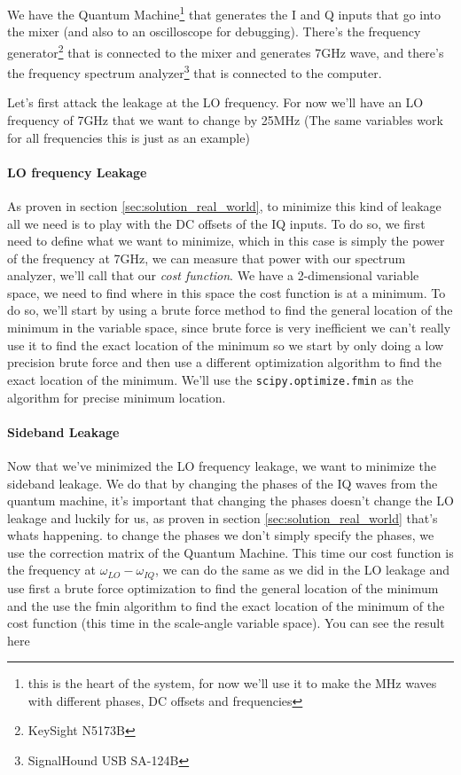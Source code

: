 We have the Quantum Machine\footnote{this is the heart of the system, for now we'll use it to make the MHz waves with different phases, DC offsets and frequencies} that generates the I and Q inputs that go into the mixer (and also to an oscilloscope for debugging). There's the frequency generator\footnote{KeySight N5173B} that is connected to the mixer and generates 7GHz wave, and there's the frequency spectrum analyzer\footnote{SignalHound USB SA-124B} that is connected to the computer.

Let's first attack the leakage at the LO frequency. For now we'll have an LO frequency of 7GHz that we want to change by 25MHz (The same variables work for all frequencies this is just as an example)

\paragraph{LO frequency Leakage}
As proven in section \ref{sec:solution_real_world}, to minimize this kind of leakage all we need is to play with the DC offsets of the IQ inputs. To do so, we first need to define what we want to minimize, which in this case is simply the power of the frequency at 7GHz, we can measure that power with our spectrum analyzer, we'll call that our \textit{cost function}.
We have a 2-dimensional variable space, we need to find where in this space the cost function is at a minimum. To do so, we'll start by using a brute force method to find the general location of the minimum in the variable space, since brute force is very inefficient we can't really use it to find the exact location of the minimum so we start by only doing a low precision brute force and then use a different optimization algorithm to find the exact location of the minimum. We'll use the \texttt{scipy.optimize.fmin} as the algorithm for precise minimum location.

\paragraph{Sideband Leakage}
Now that we've minimized the LO frequency leakage, we want to minimize the sideband leakage. We do that by changing the phases of the IQ waves from the quantum machine, it's important that changing the phases doesn't change the LO leakage and luckily for us, as proven in section \ref{sec:solution_real_world} that's whats happening. to change the phases we don't simply specify the phases, we use the correction matrix of the Quantum Machine.
This time our cost function is the frequency at $\omega_{LO} - \omega_{IQ}$, we can do the same as we did in the LO leakage and use first a brute force optimization to find the general location of the minimum and the use the fmin algorithm to find the exact location of the minimum of the cost function (this time in the scale-angle variable space). You can see the result here

